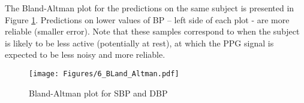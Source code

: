 \documentclass[letterpaper, 10 pt, conference]{ieeeconf}
\begin{document}
The Bland-Altman plot for the predictions on the same subject is presented in Figure \ref{fig: Bland_Alt}. Predictions on lower values of BP -- left side of each plot - are more reliable (smaller error). Note that these samples correspond to when the subject is likely to be less active (potentially at rest), at which the PPG signal is expected to be less noisy and more reliable.

\begin{figure}[btp]
     \centering
     \vspace{-1ex}
     \texttt{[image: Figures/6\_BLand\_Altman.pdf]}
     \caption{Bland-Altman plot for SBP and DBP}
     \label{fig: Bland_Alt}
     \vspace{-3.5ex}
\end{figure}




\end{document}

